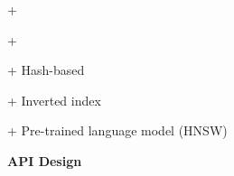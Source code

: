+ 

+ 

+ Hash-based

+ Inverted index 

+ Pre-trained language model (HNSW)


\noindent\textbf{API Design}

